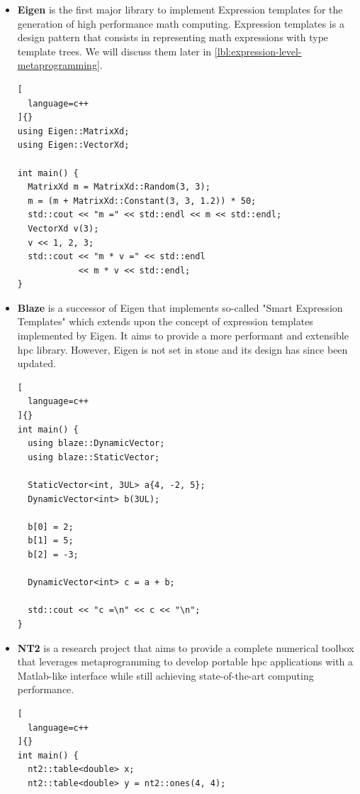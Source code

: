 \documentclass[../main]{subfiles}
\begin{document}
\begin{itemize}

  \item

\textbf{Eigen} \cite{eigen} is the first major \cpp library to implement
Expression templates for the generation of high performance math computing.
Expression templates is a \cpp design pattern that consists in representing
math expressions with type template trees. We will discuss them later
in \ref{lbl:expression-level-metaprogramming}.

\begin{lstlisting}[
  language=c++
]{}
using Eigen::MatrixXd;
using Eigen::VectorXd;

int main() {
  MatrixXd m = MatrixXd::Random(3, 3);
  m = (m + MatrixXd::Constant(3, 3, 1.2)) * 50;
  std::cout << "m =" << std::endl << m << std::endl;
  VectorXd v(3);
  v << 1, 2, 3;
  std::cout << "m * v =" << std::endl
            << m * v << std::endl;
}
\end{lstlisting}

  \item

\textbf{Blaze} \cite{blazelib} is a successor of Eigen that implements so-called
"Smart Expression Templates" which extends upon the concept of
expression templates implemented by Eigen. It aims to provide a more performant
and extensible \gls{hpc} library. However, Eigen is not set in stone
and its design has since been updated.

\begin{lstlisting}[
  language=c++
]{}
int main() {
  using blaze::DynamicVector;
  using blaze::StaticVector;

  StaticVector<int, 3UL> a{4, -2, 5};
  DynamicVector<int> b(3UL);

  b[0] = 2;
  b[1] = 5;
  b[2] = -3;

  DynamicVector<int> c = a + b;

  std::cout << "c =\n" << c << "\n";
}
\end{lstlisting}

  \item

\textbf{NT2} \cite{nt2} is a research project that aims to provide a complete
numerical toolbox that leverages metaprogramming to develop portable \gls{hpc}
applications with a Matlab-like interface while still achieving state-of-the-art
computing performance.

\begin{lstlisting}[
  language=c++
]{}
int main() {
  nt2::table<double> x;
  nt2::table<double> y = nt2::ones(4, 4);


\end{lstlisting}
\end{itemize}
\end{document}
